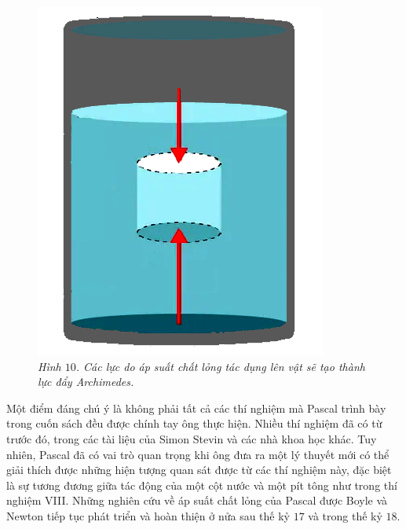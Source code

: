 \begin{multicols}{2}
\begin{figure}[H]
		\includegraphics[width= 0.75\linewidth]{12}
		\caption{\small\textit{\color{timhieukhoahoc}Hình $10$. Các lực do áp suất chất lỏng tác dụng lên vật sẽ tạo thành lực đẩy Archimedes.}}
		\vspace*{-10pt}
	\end{figure}
	Một điểm đáng chú ý là không phải tất cả các thí nghiệm mà Pascal trình bày trong cuốn sách đều được chính tay ông thực hiện. Nhiều thí nghiệm đã có từ trước đó, trong các tài liệu của Simon Stevin và các nhà khoa học khác. Tuy nhiên, Pascal đã có vai trò quan trọng khi ông đưa ra một lý  thuyết mới có thể giải thích được những hiện tượng quan sát được từ các thí nghiệm này, đặc biệt là sự tương đương giữa tác động của một cột nước và một pít tông như trong thí nghiệm VIII. Những nghiên cứu về áp suất chất lỏng của Pascal được Boyle và Newton tiếp tục phát triển và hoàn thiện ở nửa sau thế kỷ $17$ và trong thế kỷ $18$.
	\vskip 0.2cm
\end{multicols}
